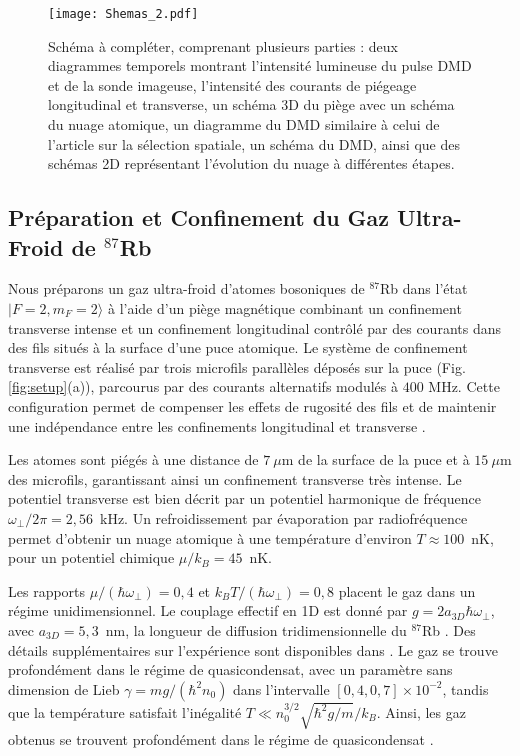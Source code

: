 \begin{figure}[!htb]
\centering
\texttt{[image: Shemas\_2.pdf]}
\caption{Schéma à compléter, comprenant plusieurs parties : deux diagrammes temporels montrant l'intensité lumineuse du pulse DMD et de la sonde imageuse, l'intensité des courants de piégeage longitudinal et transverse, un schéma 3D du piège avec un schéma du nuage atomique, un diagramme du DMD similaire à celui de l'article sur la sélection spatiale, un schéma du DMD, ainsi que des schémas 2D représentant l'évolution du nuage à différentes étapes.}
\end{figure}




\subsection{Préparation et Confinement du Gaz Ultra-Froid de $^{87}$Rb}

Nous préparons un gaz ultra-froid d'atomes bosoniques de $^{87}$Rb dans l'état $|F=2,m_F=2\rangle$ à l’aide d'un piège magnétique combinant un confinement transverse intense et un confinement longitudinal contrôlé par des courants dans des fils situés à la surface d'une puce atomique. Le système de confinement transverse est réalisé par trois microfils parallèles déposés sur la puce (Fig.\ref{fig:setup}(a)), parcourus par des courants alternatifs modulés à $400$ MHz. Cette configuration permet de compenser les effets de rugosité des fils et de maintenir une indépendance entre les confinements longitudinal et transverse \cite{PhysRevLett.98.263201}.

Les atomes sont piégés à une distance de $7~\mu$m de la surface de la puce et à $15~\mu$m des microfils, garantissant ainsi un confinement transverse très intense. Le potentiel transverse est bien décrit par un potentiel harmonique de fréquence $\omega_{\perp}/2\pi = 2{,}56$~kHz. Un refroidissement par évaporation par radiofréquence permet d’obtenir un nuage atomique à une température d’environ $T \approx 100$~nK, pour un potentiel chimique $\mu / k_B = 45$~nK.

Les rapports $\mu / (\hbar \omega_{\perp}) = 0{,}4$ et $k_B T / (\hbar \omega_{\perp}) = 0{,}8$ placent le gaz dans un régime unidimensionnel. Le couplage effectif en 1D est donné par $g = 2 a_{3D} \hbar \omega_{\perp}$, avec $a_{3D} = 5{,}3$~nm, la longueur de diffusion tridimensionnelle du $^{87}$Rb \cite{PhysRevLett.89.283202}. Des détails supplémentaires sur l’expérience sont disponibles dans \cite{duboistel-04749900}. Le gaz se trouve profondément dans le régime de quasicondensat, avec un paramètre sans dimension de Lieb $\gamma = m g / (\hbar^2 n_0)$ dans l'intervalle $[0{,}4,0{,}7] \times 10^{-2}$,  tandis que la température satisfait l’inégalité $T \ll n_0^{3/2} \sqrt{\hbar^2 g / m} / k_B$. Ainsi, les gaz obtenus se trouvent profondément dans le régime de quasicondensat \cite{PhysRevLett.91.040403}.

